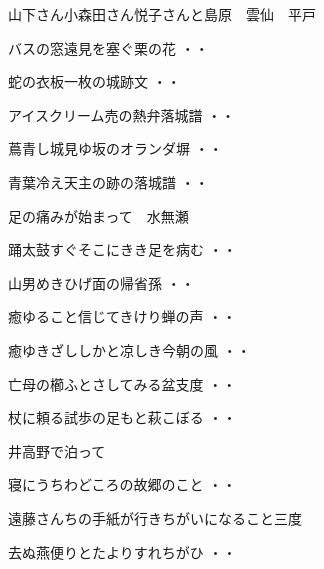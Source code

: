 山下さん小森田さん悦子さんと島原　雲仙　平戸
\begin{shiika}バスの窓遠見を塞ぐ栗の花
\hfill{・・}\end{shiika}
\begin{shiika}蛇の衣板一枚の城跡文
\hfill{・・}\end{shiika}
\begin{shiika}アイスクリーム売の熱弁落城譜
\hfill{・・}\end{shiika}
\begin{shiika}蔦青し城見ゆ坂のオランダ塀
\hfill{・・}\end{shiika}
\begin{shiika}青葉冷え天主の跡の落城譜
\hfill{・・}\end{shiika}
\vspace{0.6cm}
足の痛みが始まって　水無瀬
\begin{shiika}踊太鼓すぐそこにきき足を病む
\hfill{・・}\end{shiika}
\begin{shiika}山男めきひげ面の帰省孫
\hfill{・・}\end{shiika}
\begin{shiika}癒ゆること信じてきけり蝉の声
\hfill{・・}\end{shiika}
\begin{shiika}癒ゆきざししかと凉しき今朝の風
\hfill{・・}\end{shiika}
\begin{shiika}亡母の櫛ふとさしてみる盆支度
\hfill{・・}\end{shiika}
\begin{shiika}杖に頼る試歩の足もと萩こぼる
\hfill{・・}\end{shiika}
\vspace{0.6cm}
井高野で泊って
\begin{shiika}寝にうちわどころの故郷のこと
\hfill{・・}\end{shiika}
\vspace{0.6cm}
遠藤さんちの手紙が行きちがいになること三度
\begin{shiika}去ぬ燕便りとたよりすれちがひ
\hfill{・・}\end{shiika}
